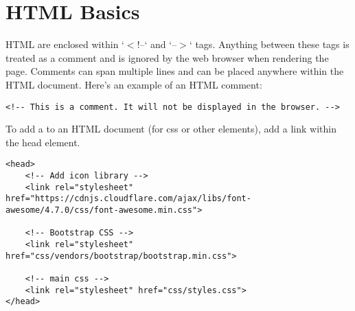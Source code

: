 \section{HTML Basics}

HTML  are enclosed within `$<$!--` and `--$>$` tags. Anything between these tags is treated as a comment and is ignored by the web browser when rendering the page. Comments can span multiple lines and can be placed anywhere within the HTML document. Here's an example of an HTML comment:
\begin{lstlisting}
<!-- This is a comment. It will not be displayed in the browser. -->
\end{lstlisting}

To add a  to an HTML document (for css or other elements), add a link within the head element.
\begin{lstlisting}
<head>		
	<!-- Add icon library -->
	<link rel="stylesheet" href="https://cdnjs.cloudflare.com/ajax/libs/font-awesome/4.7.0/css/font-awesome.min.css">		
		
	<!-- Bootstrap CSS -->
	<link rel="stylesheet" href="css/vendors/bootstrap/bootstrap.min.css">
	
	<!-- main css -->
	<link rel="stylesheet" href="css/styles.css">
</head>
\end{lstlisting}

